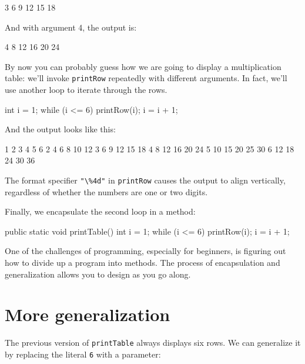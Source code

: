 \documentclass[12pt]{book}
\theoremstyle{exercise}
\newcommand{\java}[1]{\verb"#1"}
\begin{document}
\begin{stdout}
    3    6    9   12   15   18
\end{stdout}

And with argument 4, the output is:

\begin{stdout}
    4    8   12   16   20   24
\end{stdout}

By now you can probably guess how we are going to display a multiplication table: we'll invoke \java{printRow} repeatedly with different arguments.
In fact, we'll use another loop to iterate through the rows.

\begin{code}
    int i = 1;
    while (i <= 6) {
        printRow(i);
        i = i + 1;
    }
\end{code}

And the output looks like this:

\begin{stdout}
    1    2    3    4    5    6
    2    4    6    8   10   12
    3    6    9   12   15   18
    4    8   12   16   20   24
    5   10   15   20   25   30
    6   12   18   24   30   36
\end{stdout}

The format specifier \verb|"\%4d"| in \java{printRow} causes the output to align vertically, regardless of whether the numbers are one or two digits.

Finally, we encapsulate the second loop in a method:

\begin{code}
    public static void printTable() {
        int i = 1;
        while (i <= 6) {
            printRow(i);
            i = i + 1;
        }
    }
\end{code}


One of the challenges of programming, especially for beginners, is figuring out how to divide up a program into methods.
The process of encapsulation and generalization allows you to design as you go along.


\section{More generalization}

The previous version of \java{printTable} always displays six rows.
We can generalize it by replacing the literal \java{6} with a parameter:
\end{document}
